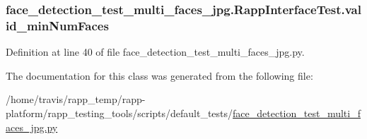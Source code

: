 \hypertarget{classface__detection__test__multi__faces__jpg_1_1RappInterfaceTest_ade517736c2fe865e851aa6b771ba351b}{
\subsubsection[{valid\-\_\-min\-Num\-Faces}]{\setlength{\rightskip}{0pt plus 5cm}face\-\_\-detection\-\_\-test\-\_\-multi\-\_\-faces\-\_\-jpg.\-Rapp\-Interface\-Test.\-valid\-\_\-min\-Num\-Faces}}\label{classface__detection__test__multi__faces__jpg_1_1RappInterfaceTest_ade517736c2fe865e851aa6b771ba351b}


Definition at line 40 of file face\-\_\-detection\-\_\-test\-\_\-multi\-\_\-faces\-\_\-jpg.\-py.



The documentation for this class was generated from the following file\-:\begin{DoxyCompactItemize}
\item 
/home/travis/rapp\-\_\-temp/rapp-\/platform/rapp\-\_\-testing\-\_\-tools/scripts/default\-\_\-tests/\hyperlink{face__detection__test__multi__faces__jpg_8py}{face\-\_\-detection\-\_\-test\-\_\-multi\-\_\-faces\-\_\-jpg.\-py}\end{DoxyCompactItemize}
